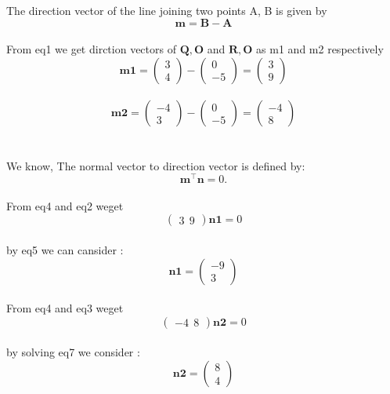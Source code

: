 \documentclass[journal,12pt,twocolumn]{article}
\newcommand{\myvec}[1]{\ensuremath{\begin{pmatrix}#1\end{pmatrix}}}
\let\vec\mathbf
\begin{document}
The direction vector of the line joining two points A, B is given by
\\

\begin{equation}
	\vec{m}=
     \vec{B}-  \vec{A}
  \label{eq-1}
\end{equation}
\\
From eq1 we get dirction vectors of ${\vec{Q},\vec{O}}$ and ${\vec{R},\vec{O}}$ as m1 and m2 respectively 
\\
\begin{equation}
	\vec{m1}=
     \myvec{
  3\\
  4
 }-  \myvec{
  0\\
  -5
 }= \myvec{3\\9}
  \label{eq-2}
\end{equation}
\\
\begin{equation}
	\vec{m2}=
     \myvec{
  -4\\
  3
 }- \myvec{0\\-5} = \myvec{-4\\8}
   \label{eq-3}
\end{equation}
\\
\\
We know,
The normal vector to direction vector is defined by:
\\
\begin{equation}
\vec{m^{\top}}\vec{n} = 0.
  \label{eq-4}
\end{equation} 
\\
From eq4 and eq2 weget
 \\
 \begin{equation}
	\myvec{3\ \ 9}
     \vec{n1}= 0
  \label{eq-5}
\end{equation}
\\
by eq5 we can cansider :
\begin{equation}	
     \vec{n1}= \myvec{-9\\ 3}
  \label{eq-6}
\end{equation}  
\\
From eq4 and eq3 weget
\begin{equation}
	\myvec{-4\ \ 8}
     \vec{n2} = 0
   \label{eq-7}
\end{equation}
\\
by solving eq7 we consider :
\begin{equation}	
     \vec{n2}= \myvec{8\\ 4}
  \label{eq-8}
\end{equation}  
\\
\end{document}
